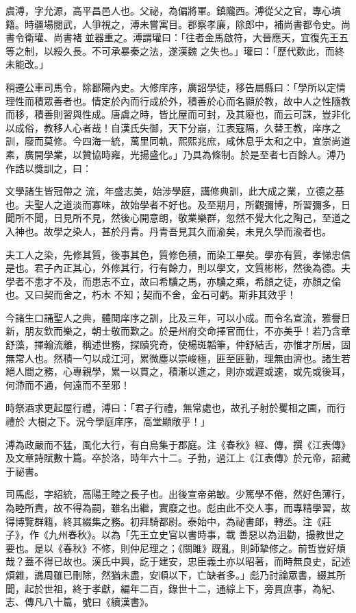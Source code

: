 \begin{pinyinscope}
 虞溥，字允源，高平昌邑人也。父祕，為偏將軍。鎮隴西。溥從父之官，專心墳籍。時疆場閱武，人爭視之，溥未嘗寓目。郡察孝廉，除郎中，補尚書都令史。尚書令衛瓘、尚書褚並器重之。溥謂瓘曰：「往者金馬啟符，大晉應天，宜復先王五等之制，以綏久長。不可承暴秦之法，遂漢魏
 之失也。」瓘曰：「歷代歎此，而終未能改。」



 稍遷公車司馬令，除鄱陽內史。大修庠序，廣詔學徒，移告屬縣曰：「學所以定情理性而積眾善者也。情定於內而行成於外，積善於心而名顯於教，故中人之性隨教而移，積善則習與性成。唐虞之時，皆比屋而可封，及其廢也，而云可誅，豈非化以成俗，教移人心者哉！自漢氏失御，天下分崩，江表寇隔，久替王教，庠序之訓，廢而莫修。今四海一統，萬里同軌，熙熙兆庶，咸休息乎太和之中，宜崇尚道素，廣開學業，以贊協時雍，光揚盛化。」乃具為條制。於是至者七百餘人。溥乃作誥以獎訓之，曰：



 文學諸生皆冠帶之
 流，年盛志美，始涉學庭，講修典訓，此大成之業，立德之基也。夫聖人之道淡而寡味，故始學者不好也。及至期月，所觀彌博，所習彌多，日聞所不聞，日見所不見，然後心開意朗，敬業樂群，忽然不覺大化之陶己，至道之入神也。故學之染人，甚於丹青。丹青吾見其久而渝矣，未見久學而渝者也。



 夫工人之染，先修其質，後事其色，質修色積，而染工畢矣。學亦有質，孝悌忠信是也。君子內正其心，外修其行，行有餘力，則以學文，文質彬彬，然後為德。夫學者不患才不及，而患志不立，故曰希驥之馬，亦驥之乘，希顏之徒，亦顏之倫也。又曰契而舍之，朽木
 不知；契而不舍，金石可虧。斯非其效乎！



 今諸生口誦聖人之典，體閒庠序之訓，比及三年，可以小成。而令名宣流，雅譽日新，朋友欽而樂之，朝士敬而歎之。於是州府交命擇官而仕，不亦美乎！若乃含章舒藻，揮翰流離，稱述世務，探賾究奇，使楊斑韜筆，仲舒結舌，亦惟才所居，固無常人也。然積一勺以成江河，累微塵以崇峻極，匪至匪勤，理無由濟也。諸生若絕人間之務，心專親學，累一以貫之，積漸以進之，則亦或遲或速，或先或後耳，何滯而不通，何遠而不至邪！



 時祭酒求更起屋行禮，溥曰：「君子行禮，無常處也，故孔子射於矍相之圃，而行禮於
 大樹之下。況今學庭庠序，高堂顯敞乎！」



 溥為政嚴而不猛，風化大行，有白烏集于郡庭。注《春秋》經、傳，撰《江表傳》及文章詩賦數十篇。卒於洛，時年六十二。子勃，過江上《江表傳》於元帝，詔藏于祕書。



 司馬彪，字紹統，高陽王睦之長子也。出後宣帝弟敏。少篤學不倦，然好色薄行，為睦所責，故不得為嗣，雖名出繼，實廢之也。彪由此不交人事，而專精學習，故得博覽群籍，終其綴集之務。初拜騎都尉。泰始中，為祕書郎，轉丞。注《莊子》，作《九州春秋》。以為「先王立史官以書時事，載
 善惡以為沮勸，撮教世之要也。是以《春秋》不修，則仲尼理之；《關雎》既亂，則師摯修之。前哲豈好煩哉？蓋不得已故也。漢氏中興，訖于建安，忠臣義土亦以昭著，而時無良史，記述煩雜，譙周雖已刪除，然猶未盡，安順以下，亡缺者多。」彪乃討論眾書，綴其所聞，起於世祖，終于孝獻，編年二百，錄世十二，通綜上下，旁貫庶事，為紀、志、傳凡八十篇，號曰《續漢書》。




\end{pinyinscope}
